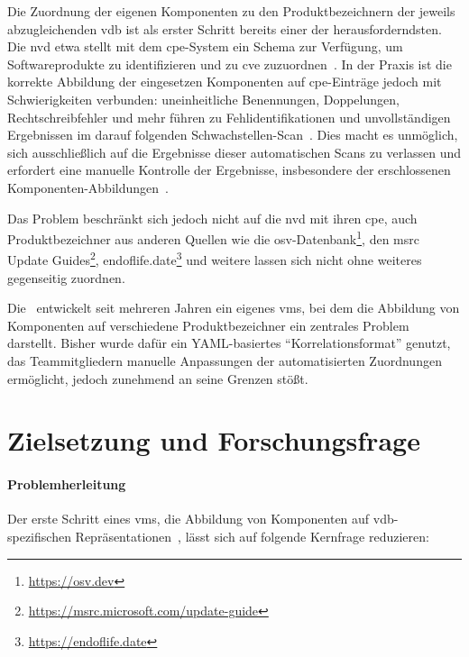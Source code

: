 Die Zuordnung der eigenen Komponenten zu den Produktbezeichnern der jeweils abzugleichenden \acrshort{vdb} ist als erster Schritt bereits einer der herausforderndsten.
Die \acrshort{nvd} etwa stellt mit dem \acrfull{cpe}-System ein Schema zur Verfügung, um Softwareprodukte zu identifizieren und zu \acrshort{cve} zuzuordnen\ \autocite{Cheikes_Waltermire_Scarfone_2011}.
In der Praxis ist die korrekte Abbildung der eingesetzen Komponenten auf \acrshort{cpe}-Einträge jedoch mit Schwierigkeiten verbunden:
uneinheitliche Benennungen, Doppelungen, Rechtschreibfehler und mehr führen zu Fehlidentifikationen und unvollständigen Ergebnissen im darauf folgenden Schwachstellen-Scan\ \autocite{Sanguino_Uetz_2017}.
Dies macht es unmöglich, sich ausschließlich auf die Ergebnisse dieser automatischen Scans zu verlassen und erfordert eine manuelle Kontrolle der Ergebnisse, insbesondere der erschlossenen Komponenten-Abbildungen\ \autocite{Sanguino_Uetz_2017}.

Das Problem beschränkt sich jedoch nicht auf die \acrshort{nvd} mit ihren \acrshort{cpe}, auch Produktbezeichner aus anderen Quellen wie die \acrfull{osv}-Datenbank\footnote{\url{https://osv.dev}}, den \acrfull{msrc} Update Guides\footnote{\url{https://msrc.microsoft.com/update-guide}}, endoflife.date\footnote{\url{https://endoflife.date}} und weitere lassen sich nicht ohne weiteres gegenseitig zuordnen.

Die \metaeffekt\ entwickelt seit mehreren Jahren ein eigenes \acrshort{vms}, bei dem die Abbildung von Komponenten auf verschiedene Produktbezeichner ein zentrales Problem darstellt.
Bisher wurde dafür ein YAML-basiertes \enquote{Korrelationsformat} genutzt, das Teammitgliedern manuelle Anpassungen der automatisierten Zuordnungen ermöglicht, jedoch zunehmend an seine Grenzen stößt.


\section{Zielsetzung und Forschungsfrage}\label{sec:ziel-forschungsfrage}

\paragraph{Problemherleitung}

Der erste Schritt eines \acrshort{vms}, die Abbildung von Komponenten auf \acrshort{vdb}-spezifischen Repräsentationen\ \autocite{Idrissi_Sebai_Faroukhi_Mahouachi_2024}, lässt sich auf folgende Kernfrage reduzieren:

